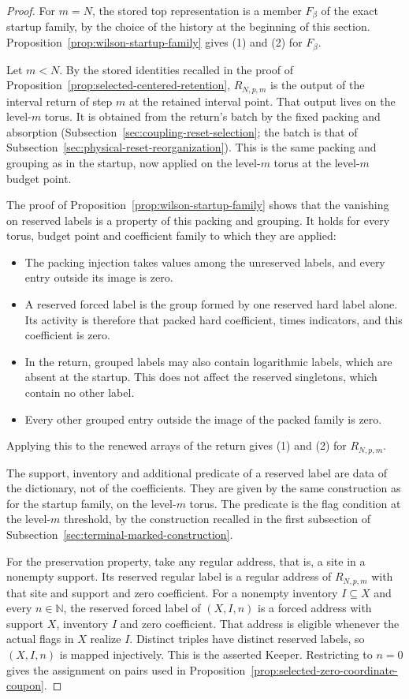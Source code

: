 \begin{proof}
For $m=N$, the stored top representation is a member $F_\beta$ of the
exact startup family, by the choice of the history at the beginning of
this section. Proposition~\ref{prop:wilson-startup-family} gives (1)
and (2) for $F_\beta$.

Let $m<N$. By the stored identities recalled in the proof of
Proposition~\ref{prop:selected-centered-retention}, $R_{N,p,m}$ is the
output of the interval return of step $m$ at the retained interval
point. That output lives on the level-$m$ torus. It is obtained from
the return's batch by the fixed packing and absorption
(Subsection~\ref{sec:coupling-reset-selection}; the batch is that of
Subsection~\ref{sec:physical-reset-reorganization}). This is the same
packing and grouping as in the startup, now applied on the level-$m$
torus at the level-$m$ budget point.

The proof of Proposition~\ref{prop:wilson-startup-family} shows that the
vanishing on reserved labels is a property of this packing and
grouping. It holds for every torus, budget point and coefficient family
to which they are applied:
\begin{itemize}
\item The packing injection takes values among the unreserved labels,
  and every entry outside its image is zero.
\item A reserved forced label is the group formed by one reserved hard
  label alone. Its activity is therefore that packed hard coefficient,
  times indicators, and this coefficient is zero.
\item In the return, grouped labels may also contain logarithmic labels,
  which are absent at the startup. This does not affect the reserved
  singletons, which contain no other label.
\item Every other grouped entry outside the image of the packed family
  is zero.
\end{itemize}
Applying this to the renewed arrays of the return gives (1) and (2) for
$R_{N,p,m}$.

The support, inventory and additional predicate of a reserved label
are data of the dictionary, not of the coefficients. They are given by
the same construction as for the startup family, on the level-$m$ torus.
The predicate is the flag condition at the level-$m$ threshold, by the
construction recalled in the first subsection of
Subsection~\ref{sec:terminal-marked-construction}.

For the preservation property, take any regular address, that is, a
site in a nonempty support. Its reserved regular label is a regular
address of $R_{N,p,m}$ with that site and support and zero coefficient.
For a nonempty inventory $I\subseteq X$ and every $n\in\mathbb N$, the
reserved forced label of $(X,I,n)$ is a forced address with support $X$,
inventory $I$ and zero coefficient. That address is eligible whenever
the actual flags in $X$ realize $I$. Distinct triples have distinct
reserved labels, so $(X,I,n)$ is mapped injectively. This is the
asserted Keeper. Restricting to $n=0$ gives the assignment on pairs used
in Proposition~\ref{prop:selected-zero-coordinate-coupon}.
\end{proof}

